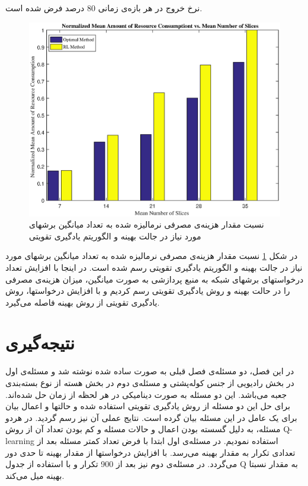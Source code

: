 نرخ خروج در هر بازه‌ی زمانی $80$ درصد فرض شده است.
\begin{figure}%
	\centering
	\includegraphics[scale = 0.6]{./fig/consumptionE} %
	\caption{  نسبت مقدار هزینه‌ی مصرفی نرمالیزه شده به تعداد میانگین برشهای مورد نیاز در جالت بهینه و الگوریتم یادگیری تقویتی }
	\label{fig:consumptionE}
\end{figure}
در شکل \ref{fig:consumptionE}
نسبت مقدار هزینه‌ی مصرفی نرمالیزه شده به تعداد میانگین برشهای مورد نیاز در جالت بهینه و الگوریتم یادگیری تقویتی رسم شده است. در اینجا با افزایش تعداد درخواستهای برشهای شبکه به منبع پردازشی به صورت میانگین، میزان هزینه‌ی مصرفی را در حالت بهینه و روش یادگیری تقویتی رسم کردیم و با افزایش درخواستها، روش یادگیری تقویتی از روش بهینه فاصله می‌گیرد. 
\section{نتیجه‌گیری}
در این فصل، دو مسئله‌ی فصل قبلی به صورت ساده شده نوشته شد و مسئله‌ی اول در بخش رادیویی از جنس کوله‌پشتی و مسئله‌ی دوم در بخش هسته از نوع 
بسته‌بندی جعبه می‌باشد. این دو مسئله به صورت دینامیکی در هر لحظه از زمان حل شده‌اند. برای حل این دو مسئله از روش یادگیری تقویتی  استفاده شده و حالتها و اعمال بیان برای یک عامل در این مسئله بیان گرده است.
نتایج عملی آن نیز رسم گردید. در هردو مسئله‌، به دلیل گسسته بودن اعمال و حالات مسئله و کم بودن تعداد آن از روش Q-learning
استفاده نمودیم. در مسئله‌ی اول ابتدا با فرض تعداد کمتر مسئله بعد از تعدادی تکرار به مقدار بهینه می‌رسد. با افزایش درخواستها از مقدار بهینه تا حدی دور می‌گردد. در مسئله‌ی دوم نیز بعد از 900 تکرار و با استفاده از جدول Q به مقدار نسبتا بهینه میل می‌کند.

  